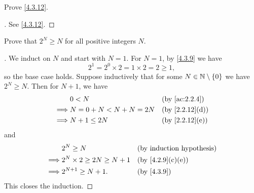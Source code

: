 \begin{ex}\label{ex:4.3.4}
  Prove \cref{4.3.12}.
\end{ex}

\begin{proof}[]
  See \cref{4.3.12}.
\end{proof}

\begin{ex}\label{ex:4.3.5}
  Prove that \(2^N \geq N\) for all positive integers \(N\).
\end{ex}

\begin{proof}[]
  We induct on \(N\) and start with \(N = 1\).
  For \(N = 1\), by \cref{4.3.9} we have
  \[
    2^1 = 2^0 \times 2 = 1 \times 2 = 2 \geq 1,
  \]
  so the base case holds.
  Suppose inductively that for some \(N \in \mathbb{N} \setminus \left\lbrace0\right\rbrace\) we have \(2^N \geq N\).
  Then for \(N + 1\), we have
  \begin{align*}
             & 0 < N                  &  & \by{ac:2.2.4}  \\
    \implies & N = 0 + N < N + N = 2N &  & \by{2.2.12}[d] \\
    \implies & N + 1 \leq 2N          &  & \by{2.2.12}[e]
  \end{align*}
  and
  \begin{align*}
             & 2^N \geq N                      &  & \byIH           \\
    \implies & 2^N \times 2 \geq 2N \geq N + 1 &  & \by{4.2.9}[c,e] \\
    \implies & 2^{N + 1} \geq N + 1.           &  & \by{4.3.9}
  \end{align*}
  This closes the induction.
\end{proof}
